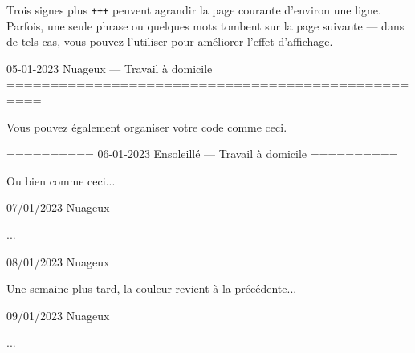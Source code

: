 \documentclass[11pt, paperstyle=light yellow, color entry, day-month-year]{jwjournal}
\begin{document}
  Trois signes plus \texttt{+++} peuvent agrandir la page courante d'environ une ligne. Parfois, une seule phrase ou quelques mots tombent sur la page suivante --- dans de tels cas, vous pouvez l'utiliser pour améliorer l'effet d'affichage.



05-01-2023    Nuageux       --- Travail à domicile
==================================================

Vous pouvez également organiser votre code comme ceci.


==========
06-01-2023    Ensoleillé    --- Travail à domicile
==========

Ou bien comme ceci...



07/01/2023  Nuageux

  ...



08/01/2023  Nuageux

  Une semaine plus tard, la couleur revient à la précédente...



09/01/2023  Nuageux

  ...
\end{document}
